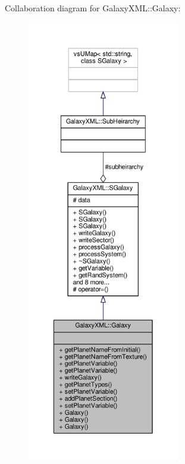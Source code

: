 Collaboration diagram for Galaxy\+X\+ML\+:\+:Galaxy\+:
\nopagebreak
\begin{figure}[H]
\begin{center}
\leavevmode
\includegraphics[height=550pt]{da/d0e/classGalaxyXML_1_1Galaxy__coll__graph}
\end{center}
\end{figure}
